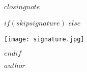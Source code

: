\documentclass[$fontsize$, a4paper]{article}
\begin{document}
\vspace{15mm}

\sffamily
\small
$closingnote$

\medskip

\begin{minipage}{\textwidth}
$if(skipsignature)$
\vspace{3.5\baselineskip}
$else$
{
      \texttt{[image: signature.jpg]} \par
}
$endif$

$author$
\end{minipage}


\end{document}
